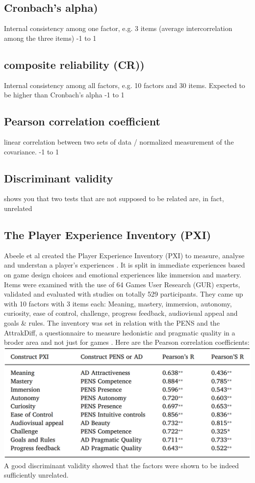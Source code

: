 \subsection{Cronbach's alpha)}
Internal consistency among one factor, e.g. 3 items (average intercorrelation among the three items)
-1 to 1

\subsection{composite reliability (CR))}
Internal consistency among all factors, e.g. 10 factors and 30 items.
Expected to be higher than Cronbach's alpha
-1 to 1

\subsection{Pearson correlation coefficient}
linear correlation between two sets of data / normalized measurement of the covariance. 
-1 to 1

\subsection{Discriminant validity}
shows you that two tests that are not supposed to be related are, in fact, unrelated

\subsection{The Player Experience Inventory (PXI)}
Abeele et al created the Player Experience Inventory (PXI) to measure, analyse and understan a player's experiences \cite{abeele2020development}. It is split in immediate experiences based on game design choices and emotional experiences like immersion and mastery. Items were examined with the use of 64 Games User Research (GUR) experts, validated and evaluated with studies on totally 529 participants. They came up with 10 factors with 3 items each: Meaning, mastery, immersion, autonomy, curiosity, ease of control, challenge, progress feedback, audiovisual appeal and goals \& rules. The inventory was set in relation with the PENS and the AttrakDiff, a questionnaire to measure hedonistic and pragmatic quality in a broder area and not just for games \cite{hassenzahl2003attrakdiff}. Here are the Pearson correlation coefficients:
\includegraphics[width=\linewidth]{"PXI_vs_PENS.png"}
A good discriminant validity showed that the factors were shown to be indeed sufficiently unrelated.


